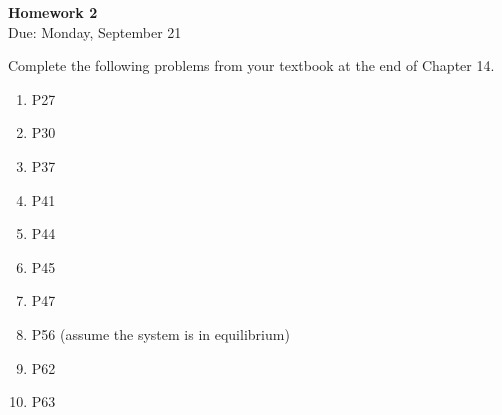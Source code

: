 \documentclass{article}
\begin{document}
\fancyfoot[C]{\thepage}
\vspace*{0cm}
\begin{center}
	{\LARGE \textbf{Homework 2}}\\
	\vspace{0.25cm}
	{\Large Due: Monday, September 21}
\end{center}

Complete the following problems from your textbook at the end of Chapter 14.
\begin{enumerate}
\item P27
\item P30
\item P37
\item P41
\item P44
\item P45
\item P47
\item P56 (assume the system is in equilibrium)
\item P62
\item P63
\end{enumerate}
\end{document}
